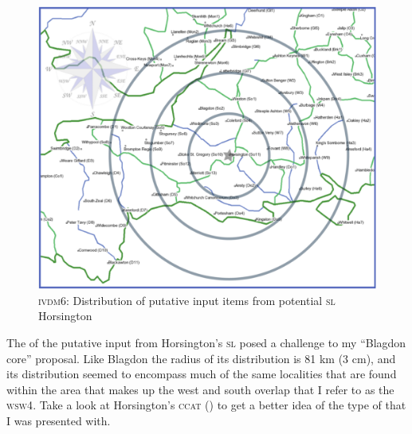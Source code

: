 \begin{figure}
\includegraphics[width=\textwidth] {figures/ivdm6.pdf}
\addtocounter{figure}{-1}\renewcommand{\thefigure}{\arabic{figure}.11a}
\caption {\textsc{ivdm6}: Distribution of putative input items from potential \textsc{sl} Horsington} 
\label{Map5.11a}
\end{figure}

The  of the putative input from Horsington's \textsc{sl} posed a challenge to my ``Blagdon core'' proposal. Like Blagdon the radius of its distribution is 81 km (3 cm), and its distribution seemed to encompass much of the same localities that are found within the area that makes up the west and south  overlap that I refer to as the \textsc{wsw4}. Take a look at Horsington's \textsc{ccat} () to get a better idea of the type of  that I was presented with.


